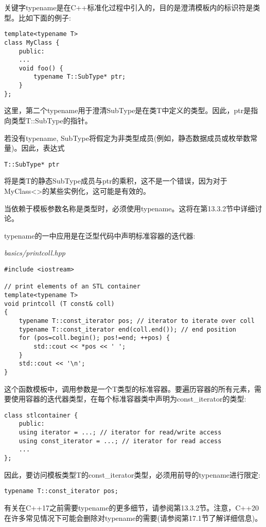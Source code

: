 关键字typename是在C++标准化过程中引入的，目的是澄清模板内的标识符是类型。比如下面的例子:

\begin{lstlisting}[style=styleCXX]
template<typename T>
class MyClass {
	public:
	...
	void foo() {
		typename T::SubType* ptr;
	}
};
\end{lstlisting}

这里，第二个typename用于澄清SubType是在类T中定义的类型。因此，ptr是指向类型T::SubType的指针。

若没有typename, SubType将假定为非类型成员(例如，静态数据成员或枚举数常量)。因此，表达式

\begin{lstlisting}[style=styleCXX]
T::SubType* ptr
\end{lstlisting}

将是类T的静态SubType成员与ptr的乘积，这不是一个错误，因为对于MyClass<>的某些实例化，这可能是有效的。

当依赖于模板参数名称是类型时，必须使用typename。这将在第13.3.2节中详细讨论。

typename的一中应用是在泛型代码中声明标准容器的迭代器:

\noindent
\textit{basics/printcoll.hpp}
\begin{lstlisting}[style=styleCXX]
#include <iostream>

// print elements of an STL container
template<typename T>
void printcoll (T const& coll)
{
	typename T::const_iterator pos; // iterator to iterate over coll
	typename T::const_iterator end(coll.end()); // end position
	for (pos=coll.begin(); pos!=end; ++pos) {
		std::cout << *pos << ' ';
	}
	std::cout << '\n';
}
\end{lstlisting}

这个函数模板中，调用参数是一个T类型的标准容器。要遍历容器的所有元素，需要使用容器的迭代器类型，在每个标准容器类中声明为const\_iterator的类型:

\begin{lstlisting}[style=styleCXX]
class stlcontainer {
	public:
	using iterator = ...; // iterator for read/write access
	using const_iterator = ...; // iterator for read access
	...
};
\end{lstlisting}

因此，要访问模板类型T的const\_iterator类型，必须用前导的typename进行限定:

\begin{lstlisting}[style=styleCXX]
typename T::const_iterator pos;
\end{lstlisting}

有关在C++17之前需要typename的更多细节，请参阅第13.3.2节。注意，C++20在许多常见情况下可能会删除对typename的需要(请参阅第17.1节了解详细信息)。












